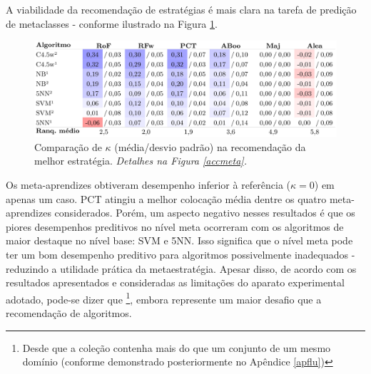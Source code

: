 A viabilidade da recomendação de estratégias é mais clara na tarefa de predição de metaclasses - conforme ilustrado na Figura \ref{stkap}.
\begin{figure}
\centering
\includegraphics[scale=0.4]{images/metastkap.pdf}
\caption[Comparação de $\kappa$ na recomendação da melhor estratégia.]{Comparação de $\kappa$ (média/desvio padrão) na recomendação da melhor estratégia.
\textit{Detalhes na Figura \ref{accmeta}.}}
\label{stkap}
\end{figure}
Os meta-aprendizes obtiveram desempenho inferior à referência ($\kappa=0$) em apenas um caso.
PCT atingiu a melhor colocação média dentre os quatro meta-aprendizes considerados.
Porém, um aspecto negativo nesses resultados é que os piores desempenhos preditivos no nível meta ocorreram com os algoritmos de maior destaque no nível base: SVM e 5NN.
Isso significa que o nível meta pode ter um bom desempenho preditivo para algoritmos possivelmente inadequados - reduzindo a utilidade prática da metaestratégia.
Apesar disso, de acordo com os resultados apresentados e consideradas as limitações do aparato experimental adotado, pode-se dizer que \footnote{Desde que a coleção contenha mais do que um conjunto de um mesmo domínio (conforme demonstrado posteriormente no Apêndice \ref{apflu})}, embora represente um maior desafio que a recomendação de algoritmos.

